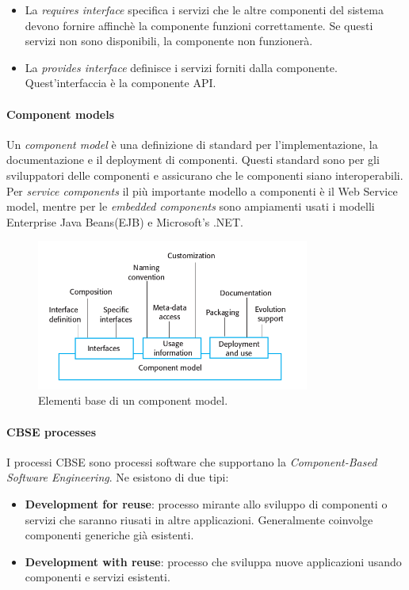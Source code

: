  			\begin{itemize}
 			 	\item La \textit{requires interface} specifica i servizi che le altre componenti del sistema devono fornire affinchè la componente funzioni correttamente. Se questi servizi non sono disponibili, la componente non funzionerà.
 			 	\item La \textit{provides interface} definisce i servizi forniti dalla componente. Quest'interfaccia è la componente API.
 			\end{itemize}

 			\paragraph{Component models}
 			Un \textit{component model} è una definizione di standard per l'implementazione, la documentazione e il deployment di componenti. Questi standard sono per gli sviluppatori delle componenti e assicurano che le componenti siano interoperabili. Per \textit{service components} il più importante modello a componenti è il Web Service model, mentre per le \textit{embedded components} sono ampiamenti usati i modelli Enterprise Java Beans(EJB) e Microsoft's .NET.

 			\begin{figure}[H]
 				\centering
 				\includegraphics[width=0.8\textwidth]{img/componentmodel}
 				\caption{Elementi base di un component model.}
 			\end{figure}

 			\paragraph{CBSE processes}
 			I processi CBSE sono processi software che supportano la \textit{Component-Based Software Engineering}. Ne esistono di due tipi:
 			\begin{itemize}
 				\item \textbf{Development for reuse}: processo mirante allo sviluppo di componenti o servizi che saranno riusati in altre applicazioni. Generalmente coinvolge componenti generiche già esistenti.
 				\item \textbf{Development with reuse}: processo che sviluppa nuove applicazioni usando componenti e servizi esistenti.
 			\end{itemize}



